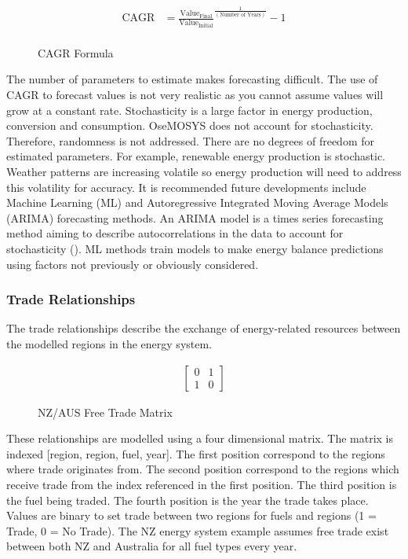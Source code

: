 \documentclass[12pt]{article}
\begin{document}
\begin{figure}
	\begin{align*}
		\text{CAGR} &= \frac{\text{Value}_{\text{Final}}}{\text{Value}_{\text{Initial}}}^{\frac{1}{(\text{Number of Years})}} - 1\\
	\end{align*}
	\caption{CAGR Formula}
	\label{fig:CAGR}
\end{figure}
The number of parameters to estimate makes forecasting difficult. The use of CAGR to forecast values is not very realistic as you cannot assume values will grow at a constant rate.
Stochasticity is a large factor in energy production, conversion and consumption.
OseMOSYS does not account for stochasticity. Therefore, randomness is not addressed. 
There are no degrees of freedom for estimated parameters.
For example, renewable energy production is stochastic. Weather patterns are increasing volatile so energy production will need to address this volatility for accuracy.
It is recommended future developments include Machine Learning (ML) and Autoregressive Integrated Moving Average Models (ARIMA) forecasting methods. 
An ARIMA model is a times series forecasting method aiming to describe autocorrelations in the data to account for stochasticity (\cite{ARIMA}). 
ML methods train models to make energy balance predictions using factors not previously or obviously considered. 

\subsubsection{Trade Relationships}
The trade relationships describe the exchange of energy-related resources between the modelled regions in the energy system.

\begin{figure}
	\begin{align*}
	\begin{bmatrix}
		0 & 1 \\
		1 & 0 
	\end{bmatrix}
	\end{align*}
	\caption{NZ/AUS Free Trade Matrix}
	\label{fig:TR}
\end{figure}
These relationships are modelled using a four dimensional matrix. The matrix is indexed [region, region, fuel, year].
The first position correspond to the regions where trade originates from. The second position correspond to the regions which receive trade from the index referenced in the first position.
The third position is the fuel being traded. The fourth position is the year the trade takes place.
Values are binary to set trade between two regions for fuels and regions (1 = Trade, 0 = No Trade).
The NZ energy system example assumes free trade exist between both NZ and Australia for all fuel types every year.
\end{document}
